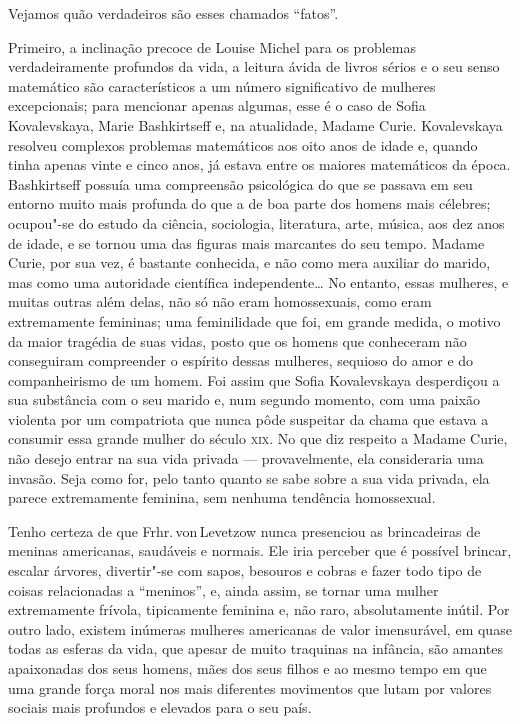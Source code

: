 Vejamos quão verdadeiros são esses chamados ``fatos''.

Primeiro, a inclinação precoce de Louise Michel para os problemas
verdadeiramente profundos da vida, a leitura ávida de livros sérios e o
seu senso matemático são característicos a um número significativo de
mulheres excepcionais; para mencionar apenas algumas, esse é o caso de
Sofia Kovalevskaya, Marie Bashkirtseff e, na atualidade, Madame Curie.
Kovalevskaya resolveu complexos problemas matemáticos aos oito anos de
idade e, quando tinha apenas vinte e cinco anos, já estava entre os
maiores matemáticos da época. Bashkirtseff possuía uma compreensão
psicológica do que se passava em seu entorno muito mais profunda do que a de
boa parte dos homens mais célebres; ocupou"-se do estudo da ciência,
sociologia, literatura, arte, música, aos dez anos de idade, e se tornou
uma das figuras mais marcantes do seu tempo. Madame Curie, por sua vez,
é bastante conhecida, e não como mera auxiliar do marido, mas como uma
autoridade científica independente\ldots{} No entanto, essas mulheres, e
muitas outras além delas, não só não eram homossexuais, como eram
extremamente femininas; uma feminilidade que foi, em grande medida, o
motivo da maior tragédia de suas vidas, posto que os homens que
conheceram não conseguiram compreender o espírito dessas mulheres,
sequioso do amor e do companheirismo de um homem. Foi assim que Sofia
Kovalevskaya desperdiçou a sua substância com o seu marido e, num
segundo momento, com uma paixão violenta por um compatriota que nunca
pôde suspeitar da chama que estava a consumir essa grande mulher do
século \textsc{xix}. No que diz respeito a Madame Curie, não desejo entrar na sua
vida privada --- provavelmente, ela consideraria uma invasão. Seja como
for, pelo tanto quanto se sabe sobre a sua vida privada, ela parece
extremamente feminina, sem nenhuma tendência homossexual.

Tenho certeza de que Frhr.\,von\,Levetzow nunca presenciou as brincadeiras de meninas americanas, saudáveis e normais. Ele iria perceber que é
possível brincar, escalar árvores, divertir"-se com sapos, besouros e
cobras e fazer todo tipo de coisas relacionadas a ``meninos'', e, ainda
assim, se tornar uma mulher extremamente frívola, tipicamente feminina
e, não raro, absolutamente inútil. Por outro lado, existem inúmeras
mulheres americanas de valor imensurável, em quase todas as esferas da
vida, que apesar de muito traquinas na infância, são amantes apaixonadas
dos seus homens, mães dos seus filhos e ao mesmo tempo em que uma grande
força moral nos mais diferentes movimentos que lutam por valores sociais
mais profundos e elevados para o seu país.

